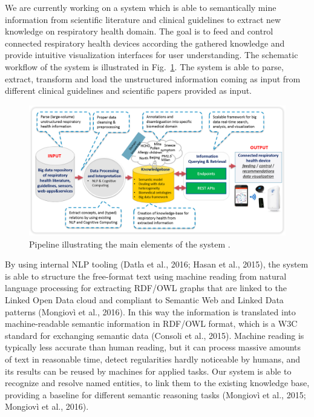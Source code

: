 \documentclass[runningheads,a4paper]{llncs}
\makeatletter
\def\maxwidth#1{\ifdim\Gin@nat@width>#1 #1\else\Gin@nat@width\fi}
\makeatother
\begin{document}
We are currently working on a system which is able to semantically mine information from scientific literature and clinical guidelines to extract new knowledge on respiratory health domain. The goal is to feed and control connected respiratory health devices according the gathered knowledge and provide intuitive visualization interfaces for user understanding. The schematic workflow of the system is illustrated in Fig.~\ref{_Ref483589901}. The system is able to parse, extract, transform and load the unstructured information coming as input from different clinical guidelines and scientific papers provided as input.
\begin{figure}[h!]
\centering
\includegraphics[width=\maxwidth{\textwidth}]{./img/image1.png}
\cprotect\caption{  Pipeline  illustrating  the  main elements of the  system .}
\label{_Ref483589901}
\end{figure}


By using internal NLP tooling (Datla et al., 2016; Hasan et al., 2015), the system is able to structure the free-format text using machine reading from natural language processing for extracting RDF/OWL graphs that are linked to the Linked Open Data cloud and compliant to Semantic Web and Linked Data patterns (Mongiov\`i et al., 2016). In this way the information is translated into machine-readable semantic information in RDF/OWL format, which is a W3C standard for exchanging semantic data (Consoli et al., 2015). Machine reading is typically less accurate than human reading, but it can process massive amounts of text in reasonable time, detect regularities hardly noticeable by humans, and its results can be reused by machines for applied tasks. Our system is able to recognize and resolve named entities, to link them to the existing knowledge base, providing a baseline for different semantic reasoning tasks (Mongiov\`i et al., 2015; Mongiov\`i et al., 2016).
\end{document}
